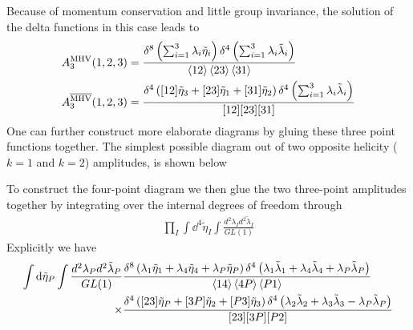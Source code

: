 \documentclass[letter,11pt]{article}
\begin{document}
Because of momentum conservation and little group invariance, the solution of the delta functions in this case leads to 
\begin{equation}
	\begin{aligned}
		A_3^{\text{MHV}}(1,2,3)&=\frac{\delta^{8}\left(\sum_{i=1}^{3}\lambda_i\tilde\eta_i\right)\delta^{4}\left(\sum_{i=1}^{3}\lambda_i\tilde\lambda_i\right)}{\expval{12}\expval{23}\expval{31}}\\
		A_3^{\overline{\text{MHV}}}(1,2,3)&=\frac{\delta^{4}\left([12]\tilde\eta_3+[23]\tilde\eta_1+[31]\tilde\eta_2\right)\delta^{4}\left(\sum_{i=1}^{3}\lambda_i\tilde\lambda_i\right)}{[12][23][31]}\\
	\end{aligned}
\end{equation}
One can further construct more elaborate diagrams by gluing these three point functions together.
The simplest possible diagram out of two opposite helicity ($k=1$ and $k=2$) amplitudes, is shown below
\begin{figure}[H]\centering\hspace*{3cm}
\end{figure}
To construct the four-point diagram we then glue the two three-point amplitudes together by integrating over the internal degrees of freedom through
\begin{equation}
	\begin{aligned}
		\prod_{I}\int \dd^4 \tilde \eta_I \int\frac{d^2\lambda_Id^2\tilde\lambda_I}{GL(1)}
	\end{aligned}
\end{equation}
Explicitly we have
\begin{equation}
	\begin{aligned}
		\int \dd \tilde \eta_{P} \int\frac{d^2\lambda_Pd^2\tilde\lambda_P}{GL(1)}&
		\frac{\delta^{8}\left(\lambda_1\tilde\eta_1+\lambda_{4}\tilde\eta_{4}+\lambda_{P}\tilde\eta_{P}\right)\delta^{4}\left(\lambda_{1}\tilde\lambda_{1}+\lambda_{4}\tilde\lambda_{4}+\lambda_{P}\tilde\lambda_{P}\right)}{\expval{14}\expval{4P}\expval{P1}}\\
		\times&\frac{\delta^{4}\left([23]\tilde\eta_{P}+[3P]\tilde\eta_{2}+[P 3]\tilde\eta_{3}\right)\delta^{4}\left(\lambda_{2}\tilde\lambda_{2}+\lambda_{3}\tilde\lambda_{3}-\lambda_{P}\tilde\lambda_{P}
			\right)}{[23][3P][P2]}
	\end{aligned}
\end{equation}
\end{document}
